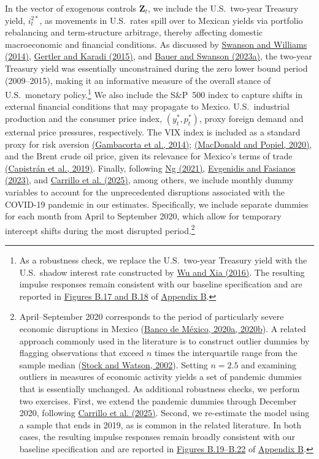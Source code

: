 \documentclass[12pt, reqno]{article}
\begin{document}
In the vector of exogenous controls $\boldsymbol{Z}_t$, we include the U.S.\ two-year Treasury yield, $i_t^{2*}$, as movements in U.S.\ rates spill over to Mexican yields via portfolio rebalancing and term-structure arbitrage, thereby affecting domestic macroeconomic and financial conditions. As discussed by \hyperlink{Swanson and Williams (2014)}{Swanson and Williams (2014)}, \hyperlink{Gertler and Karadi (2015)}{Gertler and Karadi (2015)}, and \hyperlink{Bauer and Swanson (2023a)}{Bauer and Swanson (2023a)}, the two-year Treasury yield was essentially unconstrained during the zero lower bound period (2009--2015), making it an informative measure of the overall stance of U.S.\ monetary policy.\footnote{As a robustness check, we replace the U.S.\ two-year Treasury yield with the U.S.\ shadow interest rate constructed by \hyperlink{Wu and Xia (2016)}{Wu and Xia (2016)}. The resulting impulse responses remain consistent with our baseline specification and are reported in \hyperlink{Figure B.17}{Figures B.17 and B.18} of \hyperlink{Appendix B}{Appendix B}.} We also include the S\&P~500 index to capture shifts in external financial conditions that may propagate to Mexico. U.S.\ industrial production and the consumer price index, $(y_t^*, p_t^*)$, proxy foreign demand and external price pressures, respectively. The VIX index is included as a standard proxy for risk aversion \hyperlink{Gambacorta et al. (2014)}{(Gambacorta et al., 2014)}; \hyperlink{MacDonald and Popiel (2020)}{(MacDonald and Popiel, 2020)}, and the Brent crude oil price, given its relevance for Mexico’s terms of trade \hyperlink{Capistrán et al. (2019)}{(Capistrán et al., 2019)}. Finally, following \hyperlink{Ng (2021)}{Ng (2021)}, \hyperlink{Evgenidis and Fasianos (2023)}{Evgenidis and Fasianos (2023)}, and \hyperlink{Carrillo et al. (2025)}{Carrillo et al. (2025)}, among others, we include monthly dummy variables to account for the unprecedented disruptions associated with the COVID-19 pandemic in our estimates. Specifically, we include separate dummies for each month from April to September 2020, which allow for temporary intercept shifts during the most disrupted period.\footnote{April--September 2020 corresponds to the period of particularly severe economic disruptions in Mexico (\hyperlink{Banco de Mexico (2020)}{Banco de México, 2020a, 2020b}). A related approach commonly used in the literature is to construct outlier dummies by flagging observations that exceed $n$ times the interquartile range from the sample median (\hyperlink{Stock and Watson (2002)}{Stock and Watson, 2002}). Setting $n=2.5$ and examining outliers in measures of economic activity yields a set of pandemic dummies that is essentially unchanged. As additional robustness checks, we perform two exercises. First, we extend the pandemic dummies through December 2020, following \hyperlink{Carrillo et al. (2025)}{Carrillo et al. (2025)}. Second, we re-estimate the model using a sample that ends in 2019, as is common in the related literature. In both cases, the resulting impulse responses remain broadly consistent with our baseline specification and are reported in \hyperlink{Figure B.19}{Figures B.19--B.22} of \hyperlink{Appendix B}{Appendix B}.}
\end{document}
